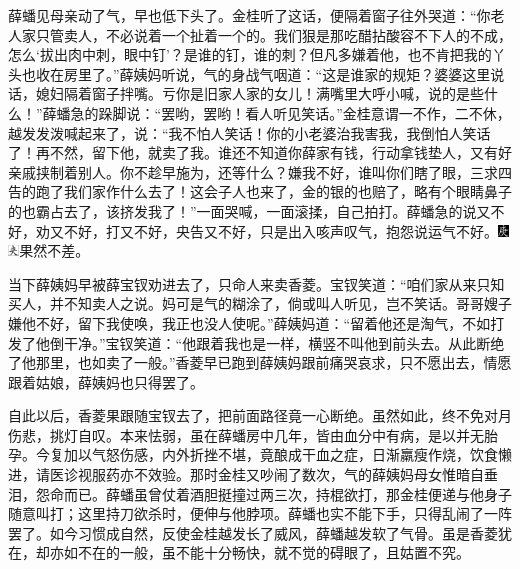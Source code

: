 薛蟠见母亲动了气，早也低下头了。金桂听了这话，便隔着窗子往外哭道：“你老人家只管卖人，不必说着一个扯着一个的。我们狠是那吃醋拈酸容不下人的不成，怎么‘拔出肉中刺，眼中钉’？是谁的钉，谁的刺？但凡多嫌着他，也不肯把我的丫头也收在房里了。”薛姨妈听说，气的身战气咽道：“这是谁家的规矩？婆婆这里说话，媳妇隔着窗子拌嘴。亏你是旧家人家的女儿！满嘴里大呼小喊，说的是些什么！”薛蟠急的跺脚说：“罢哟，罢哟！看人听见笑话。”金桂意谓一不作，二不休，越发发泼喊起来了，说：“我不怕人笑话！你的小老婆治我害我，我倒怕人笑话了！再不然，留下他，就卖了我。谁还不知道你薛家有钱，行动拿钱垫人，又有好亲戚挟制着别人。你不趁早施为，还等什么？嫌我不好，谁叫你们瞎了眼，三求四告的跑了我们家作什么去了！这会子人也来了，金的银的也赔了，略有个眼睛鼻子的也霸占去了，该挤发我了！”一面哭喊，一面滚揉，自己拍打。薛蟠急的说又不好，劝又不好，打又不好，央告又不好，只是出入咳声叹气，抱怨说运气不好。{\includegraphics[width=3mm]{../Images/00004}\includegraphics[width=3mm]{../Images/00012}\footnotesize \kaishu 果然不差。}

当下薛姨妈早被薛宝钗劝进去了，只命人来卖香菱。宝钗笑道：“咱们家从来只知买人，并不知卖人之说。妈可是气的糊涂了，倘或叫人听见，岂不笑话。哥哥嫂子嫌他不好，留下我使唤，我正也没人使呢。”薛姨妈道：“留着他还是淘气，不如打发了他倒干净。”宝钗笑道：“他跟着我也是一样，横竖不叫他到前头去。从此断绝了他那里，也如卖了一般。”香菱早已跑到薛姨妈跟前痛哭哀求，只不愿出去，情愿跟着姑娘，薛姨妈也只得罢了。

自此以后，香菱果跟随宝钗去了，把前面路径竟一心断绝。虽然如此，终不免对月伤悲，挑灯自叹。本来怯弱，虽在薛蟠房中几年，皆由血分中有病，是以并无胎孕。今复加以气怒伤感，内外折挫不堪，竟酿成干血之症，日渐羸瘦作烧，饮食懒进，请医诊视服药亦不效验。那时金桂又吵闹了数次，气的薛姨妈母女惟暗自垂泪，怨命而已。薛蟠虽曾仗着酒胆挺撞过两三次，持棍欲打，那金桂便递与他身子随意叫打；这里持刀欲杀时，便伸与他脖项。薛蟠也实不能下手，只得乱闹了一阵罢了。如今习惯成自然，反使金桂越发长了威风，薛蟠越发软了气骨。虽是香菱犹在，却亦如不在的一般，虽不能十分畅快，就不觉的碍眼了，且姑置不究。

